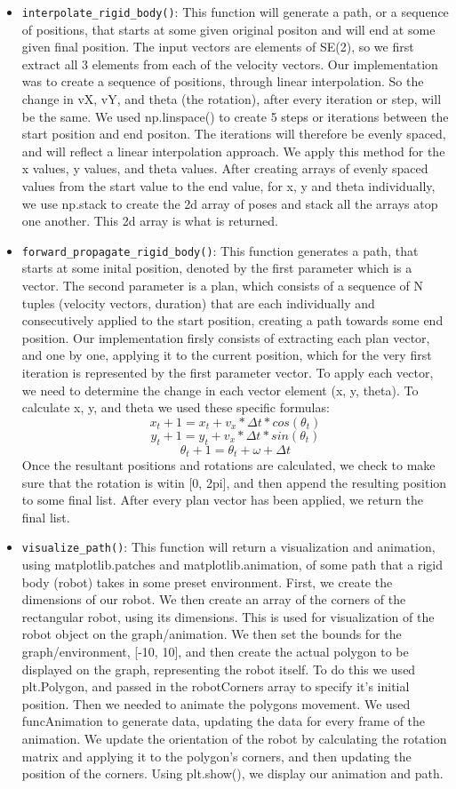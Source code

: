 \documentclass{article}
\begin{document}
\begin{itemize}
    \item \texttt{interpolate\_rigid\_body()}: This function will generate a path, or a sequence of positions, that starts at some given original positon and will end at some given final position. The input vectors are elements of SE(2), so we first extract all 3 elements from each of the velocity vectors. Our implementation was to create a sequence of positions, through linear interpolation. So the change in vX, vY, and theta (the rotation), after every iteration or step, will be the same. We used np.linspace() to create 5 steps or iterations between the start position and end positon. The iterations will therefore be evenly spaced, and will reflect a linear interpolation approach. We apply this method for the x values, y values, and theta values. After creating arrays of evenly spaced values from the start value to the end value, for x, y and theta individually, we use np.stack to create the 2d array of poses and stack all the arrays atop one another. This 2d array is what is returned. 
    \item \texttt{forward\_propagate\_rigid\_body()}: This function generates a path, that starts at some inital position, denoted by the first parameter which is a vector. The second parameter is a plan, which consists of a sequence of N tuples (velocity vectors, duration) that are each individually and consecutively applied to the start position, creating a path towards some end position. Our implementation firsly consists of extracting each plan vector, and one by one, applying it to the current position, which for the very first iteration is represented by the first parameter  vector. To apply each vector, we need to determine the change in each vector element (x, y, theta). To calculate x, y, and theta we used these specific formulas: 
    \[ x_t+1 = x_t + v_x * Δt * cos(θ_t)\]
    \[ y_t+1 = y_t + v_x * Δt * sin(θ_t)\]
    \[θ_t+1 = θ_t + ω + Δt\]
Once the resultant positions and rotations are calculated, we check to make sure that the rotation is witin [0, 2pi], and then append the resulting position to some final list. 
After every plan vector has been applied, we return the final list. 
    \item \texttt{visualize\_path()}: This function will return a visualization and animation, using matplotlib.patches and matplotlib.animation, of some path that a rigid body (robot) takes in some preset environment. First, we create the dimensions of our robot. We then create an array of the corners of the rectangular robot, using its dimensions. This is used for visualization of the robot object on the graph/animation. We then set the bounds for the graph/environment, [-10, 10], and then create the actual polygon to be displayed on the graph, representing the robot itself. To do this we used plt.Polygon, and passed in the robotCorners array to specify it's initial position. Then we needed to animate the polygons movement. We used funcAnimation to generate data, updating the data for every frame of the animation. We update the orientation of the robot by calculating the rotation matrix and applying it to the polygon's corners, and then updating the position of the corners. Using plt.show(), we display our animation and path. 

\end{itemize}
\end{document}
